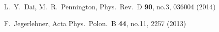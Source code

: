 \documentclass[epj,onecolumn]{webofc}
\begin{document}
\begin{thebibliography}{}
  L.~Y.~Dai, M.~R.~Pennington,
  Phys.\ Rev.\ D {\bf 90}, no.3,  036004 (2014)

  F.~Jegerlehner,
  Acta Phys.\ Polon.\ B {\bf 44}, no.11,  2257 (2013)
\end{thebibliography}
\end{document}
